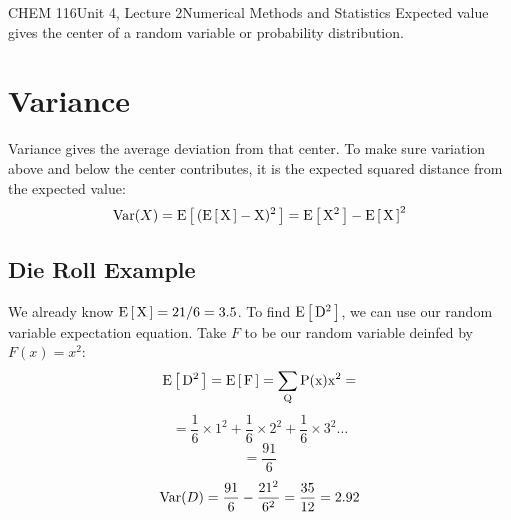 \documentclass{article}
\begin{document}
\begin{tdoc}{CHEM 116}{Unit 4, Lecture 2}{Numerical Methods and Statistics}
Expected value gives the center of a random variable or probability
distribution.

\section{Variance}

Variance gives the average deviation from that
center. To make sure variation above and below the center contributes,
it is the expected squared distance from the expected value:
\begin{equation}
\operatorname{Var}(X) = \rm{E}\left[\,(\rm{E}\left[\,X\,\right] - X)^2\,\right] = \rm{E}\left[\,X^2\,\right] - \rm{E}\left[\,X\,\right]^2
\end{equation}

\subsection{Die Roll Example}
We already know $\rm{E}\left[\,X\,\right] = 21/6 =  3.5$. To find $\rm{E}\left[\,D^2\,\right]$, we can use our
random variable expectation equation. Take $F$ to be our random
variable deinfed by $F(x) = x^2$:
\[
\rm{E}\left[\,D^2\,\right] = \rm{E}\left[\,F\,\right] = \sum_Q P(x)x^2 = 
\]
\[
= \frac{1}{6}\times{}1^2 + \frac{1}{6}\times{}2^2 + \frac{1}{6}\times{}3^2 \ldots
\]
\[
 = \frac{91}{6}
\]
\[
\operatorname{Var}(D) = \frac{91}{6} - \frac{21^2}{6^2} = \frac{35}{12} = 2.92
\]

\end{tdoc}
\end{document}
